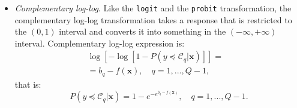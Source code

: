 \documentclass[journal]{IEEEtran}
\begin{document}
\begin{itemize}
		\item \textit{Complementary log-log}. Like the \texttt{logit} and the \texttt{probit} transformation, the complementary log-log transformation takes a response that is restricted to the $(0,1)$ interval and converts it into something in the $(-\infty, +\infty)$ interval. Complementary log-log expression is:
		\begin{equation}
		\begin{aligned}
		\log[-\log[1 - P(y \preceq \mathcal{C}_q | \mathbf{x})]] =&\\
		= b_q - f(\mathbf{x}), \quad q = 1, ..., Q-1,&
		\end{aligned}
		\label{eq:cloglog}
		\end{equation}
		that is:
		\begin{equation}
		P(y \preceq \mathcal{C}_q | \mathbf{x}) = 1 - e^{-e^{b_q - f(\mathbf{x})}}, \quad q = 1, ..., Q-1.
		\label{eq:cloglog2}
		\end{equation}
	\end{itemize}
	
\end{document}
